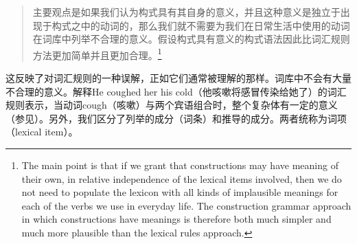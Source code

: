 \begin{quotation}
主要观点是如果我们认为构式具有其自身的意义，并且这种意义是独立于出现于构式之中的动词的，那么我们就不需要为我们在日常生活中使用的动词在词库中列举不合理的意义。假设构式具有意义的构式语法因此比词汇规则方法更加简单并且更加合理。\citep[]{Tomasello2003a}\footnote{%
The main point is that if we grant that constructions may have meaning of their own, in relative
independence of the lexical items involved, then we do not need to populate the lexicon with all
kinds of implausible meanings for each of the verbs we use in everyday life.  The construction
grammar approach in which constructions have meanings is therefore both much simpler and much more plausible than the lexical rules approach.}
\end{quotation}

\noindent
这反映了对词汇规则的一种误解，正如它们通常被理解的那样。词库中不会有大量不合理的意义。解释He coughed her his cold（他咳嗽将感冒传染给她了）的词汇规则表示，当动词cough（咳嗽）与两个宾语组合时，整个复杂体有一定的意义（参见\citet[]{Mueller2006d}）。另外，我们区分了列举的成分（词条）和推导的成分。两者统称为词项（lexical item）。

